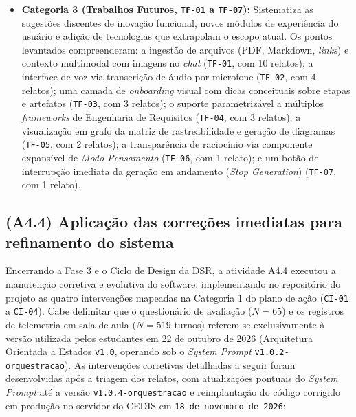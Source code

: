 \begin{itemize}
    \item \textbf{Categoria 3 (Trabalhos Futuros, \texttt{TF-01} a \texttt{TF-07}):} Sistematiza as sugestões discentes de inovação funcional, novos módulos de experiência do usuário e adição de tecnologias que extrapolam o escopo atual. Os pontos levantados compreenderam: a ingestão de arquivos (PDF, Markdown, \textit{links}) e contexto multimodal com imagens no \textit{chat} (\texttt{TF-01}, com 10 relatos); a interface de voz via transcrição de áudio por microfone (\texttt{TF-02}, com 4 relatos); uma camada de \textit{onboarding} visual com dicas conceituais sobre etapas e artefatos (\texttt{TF-03}, com 3 relatos); o suporte parametrizável a múltiplos \textit{frameworks} de Engenharia de Requisitos (\texttt{TF-04}, com 3 relatos); a visualização em grafo da matriz de rastreabilidade e geração de diagramas (\texttt{TF-05}, com 2 relatos); a transparência de raciocínio via componente expansível de \textit{Modo Pensamento} (\texttt{TF-06}, com 1 relato); e um botão de interrupção imediata da geração em andamento (\textit{Stop Generation}) (\texttt{TF-07}, com 1 relato).
\end{itemize}

\subsection{(A4.4) Aplicação das correções imediatas para refinamento do sistema}
\label{subsec:exec_a44}

Encerrando a Fase 3 e o Ciclo de Design da DSR, a atividade A4.4 executou a manutenção corretiva e evolutiva do software, implementando no repositório do projeto as quatro intervenções mapeadas na Categoria 1 do plano de ação (\texttt{CI-01} a \texttt{CI-04}). Cabe delimitar que o questionário de avaliação ($N = 65$) e os registros de telemetria em sala de aula ($N = 519$ turnos) referem-se exclusivamente à versão utilizada pelos estudantes em 22 de outubro de 2026 (Arquitetura Orientada a Estados \texttt{v1.0}, operando sob o \textit{System Prompt} \texttt{v1.0.2-orquestracao}). As intervenções corretivas detalhadas a seguir foram desenvolvidas após a triagem dos relatos, com atualizações pontuais do \textit{System Prompt} até a versão \texttt{v1.0.4-orquestracao} e reimplantação do código corrigido em produção no servidor do CEDIS em \texttt{18 de novembro de 2026}:

